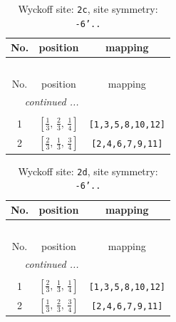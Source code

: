 \documentclass[fleqn,8pt]{jsarticle}
\begin{document}
\renewcommand{\arraystretch}{1.2}
\begin{longtable}{ccc}
\caption{Wyckoff site: {\tt 2c}, site symmetry: {\tt -6'..}}
 \\
 \hline \hline
No. & position & mapping \\ \hline \endfirsthead

\multicolumn{2}{l}{\tablename\ \thetable{}} \\
 \hline \hline
No. & position & mapping \\ \hline \endhead

 \hline \hline
\multicolumn{2}{r}{\footnotesize\it continued ...} \\ \endfoot

 \hline \hline
\multicolumn{2}{r}{} \\ \endlastfoot

1 & $\left[ \frac{1}{3},\, \frac{2}{3},\, \frac{1}{4} \right]$ & {\tt [1,3,5,8,10,12]} \\ \hline
2 & $\left[ \frac{2}{3},\, \frac{1}{3},\, \frac{3}{4} \right]$ & {\tt [2,4,6,7,9,11]} \\
\end{longtable}
\renewcommand{\arraystretch}{1.2}
\begin{longtable}{ccc}
\caption{Wyckoff site: {\tt 2d}, site symmetry: {\tt -6'..}}
 \\
 \hline \hline
No. & position & mapping \\ \hline \endfirsthead

\multicolumn{2}{l}{\tablename\ \thetable{}} \\
 \hline \hline
No. & position & mapping \\ \hline \endhead

 \hline \hline
\multicolumn{2}{r}{\footnotesize\it continued ...} \\ \endfoot

 \hline \hline
\multicolumn{2}{r}{} \\ \endlastfoot

1 & $\left[ \frac{2}{3},\, \frac{1}{3},\, \frac{1}{4} \right]$ & {\tt [1,3,5,8,10,12]} \\ \hline
2 & $\left[ \frac{1}{3},\, \frac{2}{3},\, \frac{3}{4} \right]$ & {\tt [2,4,6,7,9,11]} \\
\end{longtable}
\renewcommand{\arraystretch}{1.2}
\end{document}
